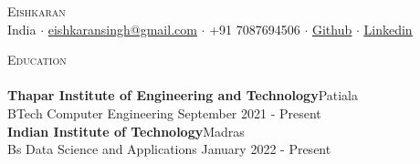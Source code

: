 \documentclass[a4paper]{article}
\newcommand{\lineunder} {
    \vspace*{-8pt} \\
    \hspace*{-18pt} \hrulefill \\
}
\newcommand{\header} [1] {
    {\hspace*{-18pt}\vspace*{6pt} \textsc{#1}}
    \vspace*{-6pt} \lineunder
}
\begin{document}
\vspace*{-40pt}

    

\vspace*{-9pt}
\begin{center}
	{\Huge \scshape {Eishkaran}}\\
	\vspace{1mm}
	India $\cdot$ \underline{eishkaransingh@gmail.com} $\cdot$ +91 7087694506 $\cdot$ \href{https://github.com/EISHKARAN}{\underline{Github}} $\cdot$ \href{https://www.linkedin.com/in/eishkaran-singh/}{\underline{Linkedin}} \\
\end{center}

\vspace{0.5mm}
\header{Education}
\vspace{0mm}
\textbf{Thapar Institute of Engineering and Technology}\hfill Patiala\\
BTech Computer  Engineering \hfill September 2021 - Present\\
\vspace{0.3mm}
\textbf{Indian Institute of Technology}\hfill Madras\\
Bs Data Science and Applications \hfill January 2022 - Present\\
\vspace{0.5mm}

 

\end{document}
